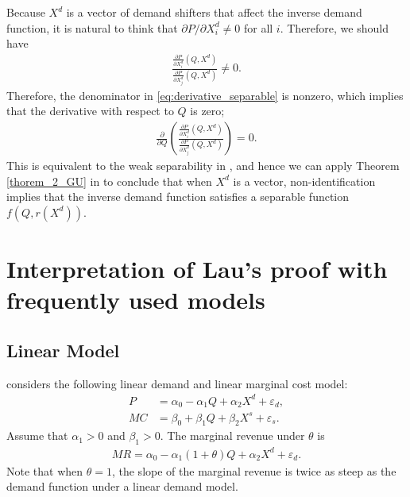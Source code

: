 \documentclass[11pt, a4paper]{article}
\theoremstyle{remark}
\begin{document}
Because $X^{d}$ is a vector of demand shifters that affect the inverse demand function, it is natural to think that $\partial P/\partial X^{d}_{i} \ne 0$ for all $i$.
Therefore, we should have
\begin{align}
    \frac{\frac{\partial P}{\partial X^{d}_{i}}(Q, X^{d})}{\frac{\partial P}{\partial X^{d}_{j}}(Q, X^{d})} \ne 0.
\end{align}
Therefore, the denominator in \eqref{eq:derivative_separable} is nonzero, which implies that the derivative with respect to $Q$ is zero;
\begin{align}
    \frac{\partial}{\partial Q} \left(\frac{\frac{\partial P}{\partial X^{d}_{i}}(Q, X^{d})}{\frac{\partial P}{\partial X^{d}_{j}}(Q, X^{d})}\right) = 0.
\end{align}
This is equivalent to the weak separability in \citet{goldmanNote1964}, and hence we can apply Theorem \ref{thorem_2_GU} in \citet{goldmanNote1964} to conclude that when $X^{d}$ is a vector, non-identification implies that the inverse demand function satisfies a separable function $f(Q, r(X^{d}))$.



\section{Interpretation of Lau's proof with frequently used models}
\subsection{Linear Model}

\citet{bresnahan1982oligopoly} considers the following linear demand and linear marginal cost model:
\begin{align}
    P & = \alpha_0 - \alpha_1 Q + \alpha_2 X^d + \varepsilon_d,\label{eq:bresnahan_demand} \\
    MC & = \beta_0 + \beta_1 Q + \beta_2 X^s + \varepsilon_s. \label{eq:bresnahan_marginal_cost}
\end{align}
Assume that $\alpha_1>0$ and $\beta_1 >0$.
The marginal revenue under $\theta$ is
\begin{align}
    MR = \alpha_0 - \alpha_1(1 + \theta) Q + \alpha_2 X^d + \varepsilon_d. \label{eq:bresnahan_marginal_revenue}
\end{align}
Note that when $\theta = 1$, the slope of the marginal revenue is twice as steep as the demand function under a linear demand model.
\end{document}
